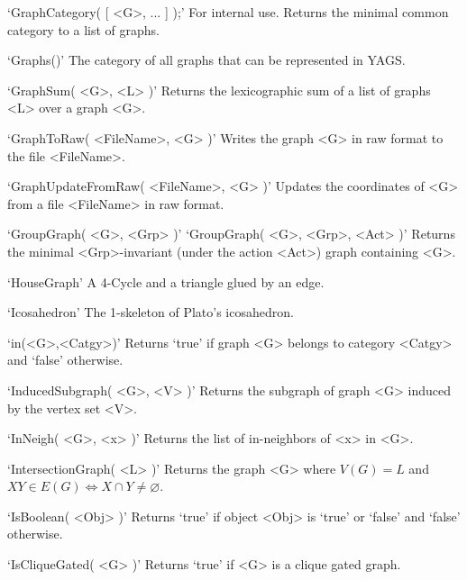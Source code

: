 `GraphCategory( [ <G>, ... ] );'\newline\hglue 5mm 
For internal use. Returns the minimal common category to a list of graphs.

`Graphs()'\newline\hglue 5mm 
The category of all  graphs  that  can  be  represented in YAGS.

`GraphSum( <G>, <L> )'\newline\hglue 5mm 
Returns the lexicographic sum of a list of graphs <L> over a graph <G>.

`GraphToRaw( <FileName>, <G> )'\newline\hglue 5mm 
Writes the graph <G> in raw format to the file  <FileName>.

`GraphUpdateFromRaw( <FileName>, <G> )'\newline\hglue 5mm 
Updates  the  coordinates  of  <G>  from  a file <FileName> in raw format.

`GroupGraph( <G>, <Grp> )'\newline
`GroupGraph( <G>, <Grp>, <Act> )'\newline\hglue 5mm 
Returns the minimal <Grp>-invariant (under the action <Act>) graph containing <G>.

`HouseGraph'\newline\hglue 5mm 
A 4-Cycle and a triangle glued by an edge.

`Icosahedron'\newline\hglue 5mm 
The 1-skeleton of Plato's icosahedron.

`in(<G>,<Catgy>)'\newline\hglue 5mm 
Returns  `true'  if  graph  <G>  belongs  to  category <Catgy> and `false' otherwise.

`InducedSubgraph( <G>, <V> )'\newline\hglue 5mm 
Returns the subgraph of graph <G> induced by the vertex set <V>.

`InNeigh( <G>, <x> )'\newline\hglue 5mm 
Returns the list of in-neighbors of <x> in <G>.

`IntersectionGraph( <L> )'\newline\hglue 5mm 
Returns the graph <G> where $V(G)=L$ and $XY\in E(G) \iff X\cap Y \neq \varnothing$.

`IsBoolean( <Obj> )'\newline\hglue 5mm 
Returns `true' if object <Obj> is `true' or `false' and `false' otherwise.

`IsCliqueGated( <G> )'\newline\hglue 5mm 
Returns `true' if <G> is a clique gated graph.

